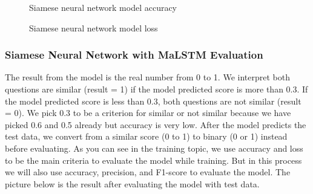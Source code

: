 \documentclass[12pt,oneside,openright,a4paper]{cpe-english-project}
\begin{document}
\begin{figure}[!h]\centering
{}
\caption{Siamese neural network model accuracy}\label{fig:siam_acc}
\end{figure}
\begin{figure}[!h]\centering
{}
\caption{Siamese neural network model loss}\label{fig:siam_loss}
\end{figure}

\subsubsection{Siamese Neural Network with MaLSTM Evaluation}
\label{siamese_evaluation}
The result from the model is the real number from 0 to 1. We interpret both questions are similar (result = 1) if the model predicted score is more than 0.3. If the model predicted score is less than 0.3, both questions are not similar (result = 0). We pick 0.3 to be a criterion for similar or not similar because we have picked 0.6 and 0.5 already but accuracy is very low. After the model predicts the test data, we convert from a similar score (0 to 1)  to binary (0 or 1) instead before evaluating. As you can see in the training topic, we use accuracy and loss to be the main criteria to evaluate the model while training. But in this process we will also use accuracy, precision, and F1-score to evaluate the model. The picture below is the result after evaluating the model with test data.
\end{document}
